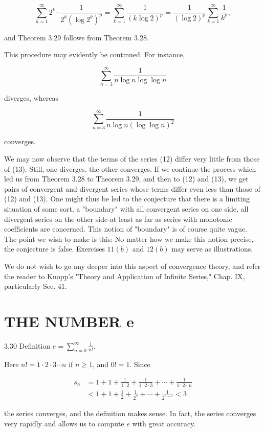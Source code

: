 \documentclass[10pt]{article}
\begin{document}
$$
\sum_{k=1}^{\infty} 2^{k} \cdot \frac{1}{2^{k}\left(\log 2^{k}\right)^{p}}=\sum_{k=1}^{\infty} \frac{1}{(k \log 2)^{p}}=\frac{1}{(\log 2)^{p}} \sum_{k=1}^{\infty} \frac{1}{k^{p}},
$$

and Theorem 3.29 follows from Theorem 3.28.

This procedure may evidently be continued. For instance,

$$
\sum_{n=3}^{\infty} \frac{1}{n \log n \log \log n}
$$

diverges, whereas

$$
\sum_{n=3}^{\infty} \frac{1}{n \log n(\log \log n)^{2}}
$$

converges.

We may now observe that the terms of the series (12) differ very little from those of (13). Still, one diverges, the other converges. If we continue the process which led us from Theorem 3.28 to Theorem 3.29, and then to (12) and (13), we get pairs of convergent and divergent series whose terms differ even less than those of (12) and (13). One might thus be led to the conjecture that there is a limiting situation of some sort, a "boundary" with all convergent series on one side, all divergent series on the other side-at least as far as series with monotonic coefficients are concerned. This notion of "boundary" is of course quite vague. The point we wish to make is this: No matter how we make this notion precise, the conjecture is false. Exercises $11(b)$ and $12(b)$ may serve as illustrations.

We do not wish to go any deeper into this aspect of convergence theory, and refer the reader to Knopp's "Theory and Application of Infinite Series," Chap. IX, particularly Sec. 41.

\section{THE NUMBER $\boldsymbol{e}$}
3.30 Definition $e=\sum_{n=0}^{\infty} \frac{1}{n !}$.

Here $n !=1 \cdot 2 \cdot 3 \cdots n$ if $n \geq 1$, and $0 !=1$. Since

$$
\begin{aligned}
s_{n} & =1+1+\frac{1}{1 \cdot 2}+\frac{1}{1 \cdot 2 \cdot 3}+\cdots+\frac{1}{1 \cdot 2 \cdots n} \\
& <1+1+\frac{1}{2}+\frac{1}{2^{2}}+\cdots+\frac{1}{2^{n-1}}<3
\end{aligned}
$$

the series converges, and the definition makes sense. In fact, the series converges very rapidly and allows us to compute $e$ with great accuracy.
\end{document}

